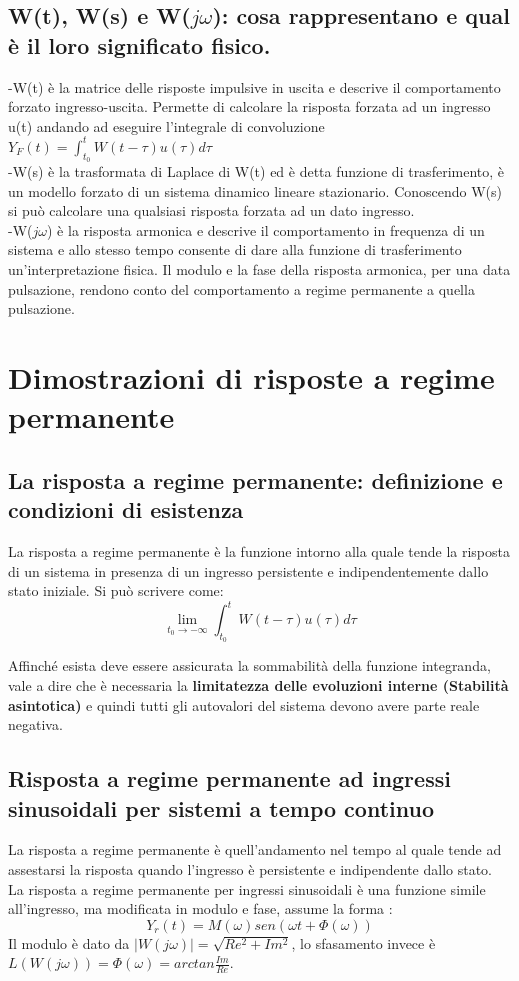 \documentclass{article}
\begin{document}
\subsection{W(t), W(s) e W($j\omega$): cosa rappresentano e qual è il loro significato fisico.}
-W(t) è la matrice delle risposte impulsive in uscita e descrive il comportamento forzato ingresso-uscita. Permette di calcolare la risposta forzata ad un ingresso u(t) andando ad eseguire l'integrale di convoluzione $Y_F(t)=\int_{t_0}^{t} W(t-\tau)u(\tau)d\tau $\\
-W(s) è la trasformata di Laplace di W(t) ed è detta funzione di trasferimento, è un modello forzato di un sistema dinamico lineare stazionario. Conoscendo W(s) si può calcolare una qualsiasi risposta forzata ad un dato ingresso.\\
-W($j\omega$) è la risposta armonica e descrive il comportamento in  frequenza di un sistema e allo stesso tempo consente di dare alla funzione di trasferimento un'interpretazione fisica. Il modulo e la fase della risposta armonica, per una data pulsazione, rendono conto del comportamento a regime permanente a quella pulsazione.

\section{Dimostrazioni di risposte a regime permanente}


\subsection{La risposta a regime permanente: definizione e condizioni di esistenza}
La risposta a regime permanente è la funzione intorno alla quale tende la risposta di un sistema
in presenza di un ingresso persistente e indipendentemente dallo stato iniziale.
Si può scrivere come:
\[\lim_ {t_0 \to -\infty} \int_{t_0}^{t} W(t-\tau)u(\tau) d\tau  \]

Affinché esista deve essere assicurata la sommabilità della funzione integranda,
vale a dire che è necessaria la \textbf{limitatezza delle evoluzioni interne (Stabilità asintotica)}
e quindi tutti gli autovalori del sistema devono avere parte reale negativa.


\subsection{Risposta a regime permanente ad ingressi sinusoidali per sistemi a tempo continuo}
La risposta a regime permanente è quell'andamento
nel tempo al quale tende ad assestarsi la risposta
quando l'ingresso è persistente e indipendente dallo stato.
La risposta a regime permanente per ingressi sinusoidali
è una funzione simile all'ingresso, ma modificata in modulo e fase, assume la forma :
\[ Y_r(t)=M(\omega)sen(\omega t + \Phi(\omega))\]
Il modulo è dato da $|W(j\omega)|=\sqrt{Re^2+Im^2}$,
lo sfasamento invece è $ L(W(j\omega))=\Phi(\omega)=arctan \frac{Im}{Re}$.
\end{document}
